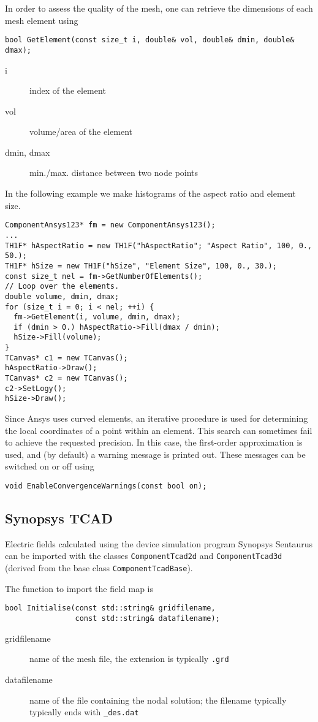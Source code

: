 In order to assess the quality of the mesh, 
one can retrieve the dimensions of each mesh element using
\begin{lstlisting}
bool GetElement(const size_t i, double& vol, double& dmin, double& dmax);
\end{lstlisting}
\begin{description}
\item[i] index of the element
\item[vol] volume/area of the element
\item[dmin, dmax] min./max. distance between two node points
\end{description}

In the following example we make histograms of the aspect ratio and 
element size.
\begin{lstlisting}
ComponentAnsys123* fm = new ComponentAnsys123();
...
TH1F* hAspectRatio = new TH1F("hAspectRatio"; "Aspect Ratio", 100, 0., 50.);
TH1F* hSize = new TH1F("hSize", "Element Size", 100, 0., 30.);
const size_t nel = fm->GetNumberOfElements();
// Loop over the elements.
double volume, dmin, dmax;
for (size_t i = 0; i < nel; ++i) {
  fm->GetElement(i, volume, dmin, dmax);
  if (dmin > 0.) hAspectRatio->Fill(dmax / dmin);
  hSize->Fill(volume);
}
TCanvas* c1 = new TCanvas();
hAspectRatio->Draw();
TCanvas* c2 = new TCanvas();
c2->SetLogy();
hSize->Draw();
\end{lstlisting}

Since Ansys uses curved elements, an iterative procedure is used for 
determining the local coordinates of a point within an element. 
This search can sometimes fail to achieve the requested precision.
In this case, the first-order approximation is used, and (by default) 
a warning message is printed out. These messages can be switched on or off 
using 
\begin{lstlisting}
void EnableConvergenceWarnings(const bool on);
\end{lstlisting}

\subsection{Synopsys TCAD}

Electric fields calculated using the device simulation program 
Synopsys Sentaurus \cite{Synopsys} can be imported with the classes 
\texttt{ComponentTcad2d} and \texttt{ComponentTcad3d} (derived from 
the base class \texttt{ComponentTcadBase}).

The function to import the field map is 
\begin{lstlisting}
bool Initialise(const std::string& gridfilename,
                const std::string& datafilename);
\end{lstlisting}
\begin{description}
  \item[gridfilename]
  name of the mesh file, the extension is typically \texttt{.grd}
  \item[datafilename]
  name of the file containing the nodal solution;
  the filename typically typically ends with \texttt{\_des.dat}
\end{description}

